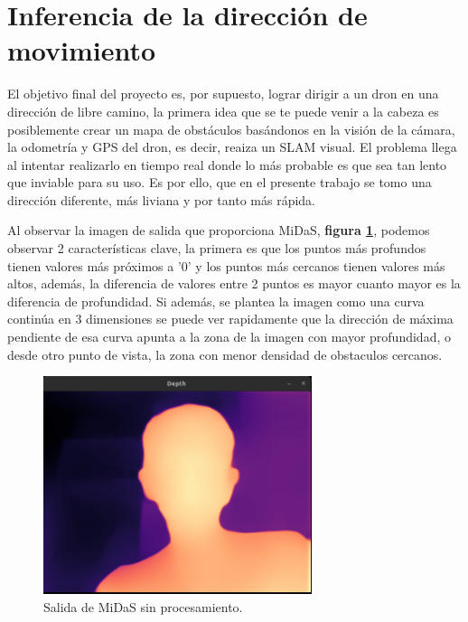     \section{Inferencia de la dirección de movimiento}
El objetivo final del proyecto es, por supuesto, lograr dirigir a un dron en una dirección de libre camino, la primera idea que se te puede venir a la cabeza es posiblemente crear un mapa de obstáculos basándonos en la visión de la cámara, la odometría y GPS del dron, es decir, reaiza un SLAM visual. El problema llega al intentar realizarlo en tiempo real donde lo más probable es que sea tan lento que inviable para su uso. Es por ello, que en el presente trabajo se tomo una dirección diferente, más liviana y por tanto más rápida.

Al observar la imagen de salida que proporciona MiDaS, \textbf{figura \ref{fig:midas_midas}}, podemos observar 2 características clave, la primera es que los puntos más profundos tienen valores más próximos a '0' y los puntos más cercanos tienen valores más altos, además, la diferencia de valores entre 2 puntos es mayor cuanto mayor es la diferencia de profundidad. Si además, se plantea la imagen como una curva continúa en 3 dimensiones se puede ver rapidamente que la dirección de máxima pendiente de esa curva apunta a la zona de la imagen con mayor profundidad, o desde otro punto de vista, la zona con menor densidad de obstaculos cercanos.


\begin{figure}[H]
    \centering
    \includegraphics[width=0.7\textwidth]{images/midas_midas.png}
    \caption{Salida de MiDaS sin procesamiento.}
    \label{fig:midas_midas}
\end{figure}


